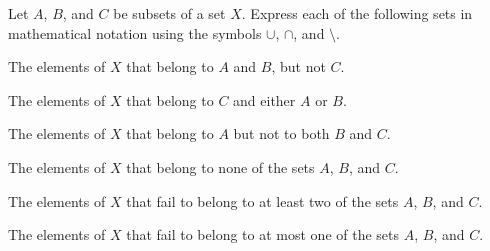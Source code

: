 \label{sec_sets_exer}

\be

\item Let $A$, $B$, and $C$ be subsets of a set $X$. Express each of the following sets in mathematical notation using the symbols $\cup$, $\cap$, and $\setminus$.
\ba
\item The elements of $X$ that belong to $A$ and $B$, but not $C$.

\item The elements of $X$ that belong to $C$ and either $A$ or $B$.

\item The elements of $X$ that belong to $A$ but not to both $B$ and $C$.

\item The elements of $X$ that belong to none of the sets $A$, $B$, and $C$.

\item The elements of $X$ that fail to belong to at least two of the sets $A$, $B$, and $C$.

\item  The elements of $X$ that fail to belong to at most one of the sets $A$, $B$, and $C$.

\ea

\begin{comment}

\ExerciseSolution

\ba
\item This set $A \cap B$ is the set of elements that belong to both $A$ and $B$. So the set in question is $(A \cap B) \setminus C$. 

\item The set $A \cup B$ is the set of elements belonging to $A$ or $B$. So the set in question is $C \cap (A \cup B)$. 

\item The set of elements that belong to both $B$ and $C$ is $B \cap C$. So the set in question is $A \setminus (B \cap C)$. 

\item We remove the elements of $A \cup B \cup C$ from $X$. So the set in question is $X \setminus (A \cup B \cup C)$. 

\item The set of elements that belong to at least two of the sets $A$, $B$, and $C$ is $(A \cap B) \cup (A \cap C) \cup (B \cap C)$. So the set in question is $X \setminus ((A \cap B) \cup (A \cap C) \cup (B \cap C))$. 

\item  The set of elements that belong to $A$ but not $B$ or $C$ is $A \setminus (B \cup C)$. So the set of elements that belong to exactly one of $A$, $B$, or $C$ is $(A \setminus (B \cup C)) \cup (B \setminus (A \cup C)) \cup (C \setminus (A \cup B))$. The set of elements that belong to none of $A$, $B$, or $C$ is $X \setminus(A \cup B \cup C)$. So the set in question is 
\[(A \setminus (B \cup C)) \cup (B \setminus (A \cup C)) \cup (C \setminus (A \cup B)) \cup (X \setminus(A \cup B \cup C)).\]

\ea

\end{comment}



